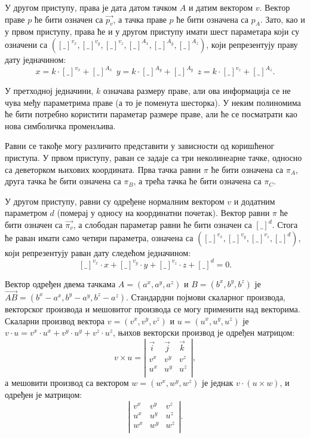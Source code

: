 У другом приступу, права је дата датом тачком $A$ и датим вектором
$v$. Вектор праве $p$ ће бити означен са $\overrightarrow{p_v}$, а
тачка праве $p$ ће бити означена са $p_A$. Зато, као и у првом
приступу, права ће и у другом приступу имати шест параметара који су
означени са $({[\_]}^{v_x}, {[\_]}^{v_y}, {[\_]}^{v_z}, {[\_]}^{A_x},
{[\_]}^{A_y}, {[\_]}^{A_z})$, који репрезентују праву дату једначином:
$$x = k\cdot[\_]^{v_x} + {[\_]}^{A_x}\ \ y = k\cdot[\_]^{A_y} +
{[\_]}^{A_y}\ \ z = k\cdot[\_]^{v_z} + {[\_]}^{A_z}.$$

У претходној једначини, $k$ означава размеру праве, али ова
информација се не чува међу параметрима праве (а то је поменута
шесторка). У неким полиномима ће бити потребно користити параметар
размере праве, али ће се посматрати као нова симболичка променљива.

Равни се такође могу различито представити у зависности од коришћеног
приступа. У првом приступу, раван се задаје са три неколинеарне тачке,
односно са деветорком њихових координата.  Прва тачка равни $\pi$ ће
бити означена са $\pi_A$, друга тачка ће бити означена са $\pi_B$, а
трећа тачка ће бити означена са $\pi_C$.

У другом приступу, равни су одређене нормалним вектором $v$ и додатним
параметром $d$ (померај у односу на координатни почетак). Вектор равни
$\pi$ ће бити означен са $\overrightarrow{\pi_v}$, а слободан
параметар равни ће бити означен са ${[\_]}^{d}$. Стога ће раван имати
само четири параметра, означена са $({[\_]}^{v_x}, {[\_]}^{v_y},
{[\_]}^{v_z}, {[\_]}^{d})$, који репрезентују раван дату следећом
једначином:
$${[\_]}^{v_x}\cdot x + {[\_]}^{v_y}\cdot y + {[\_]}^{v_z}\cdot z +
{[\_]}^{d} = 0.$$

Вектор одређен двема тачкама $A = (a^x, a^y, a^z)$ и $B = (b^x, b^y,
b^z)$ је $\overrightarrow{AB} = (b^x- a^x, b^y - a^y, b^z -
a^z)$. Стандардни појмови скаларног производа, векторског производа и
мешовитог производа се могу применити над векторима. Скаларни производ
вектора $v = (v^x, v^y, v^z)$ и $u = (u^x, u^y, u^z)$ је $v\cdot u =
v^x\cdot u^x+ v^y\cdot u^y + v^z\cdot u^z$, њихов векторски производ
је одређен матрицом:
$$ v\times u = \left|\begin{array}{ccc} \overrightarrow{i} & \overrightarrow{j} & \overrightarrow{k} \\ 
                       v^x& v^y & v^z \\
                       u^x& u^y & u^z \\
\end{array}\right|,$$
а мешовити производ са вектором $w = (w^x, w^y, w^z)$ је једнак
$v\cdot (u \times w)$, и одређен је матрицом:
$$\left|\begin{array}{ccc} v^x& v^y & v^z \\ u^x& u^y
  & u^z \\ w^x& w^y & w^z \\
\end{array}\right|.$$

